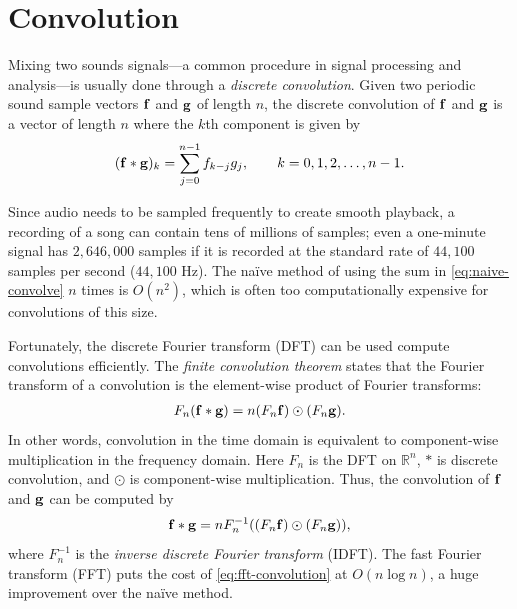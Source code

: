 
\section*{Convolution} %

Mixing two sounds signals---a common procedure in signal processing and analysis---is usually done through a \emph{discrete convolution}.
Given two periodic sound sample vectors $\mathbf{f}$ and $\mathbf{g}$ of length $n$, the discrete convolution of $\mathbf{f}$ and $\mathbf{g}$ is a vector of length $n$ where the $k$th component is given by
\begin{align}
(\mathbf{f} \ast \mathbf{g})_k = \sum_{j=0}^{n-1} f_{k-j}g_j,\qquad k = 0,1,2,\dots,n-1.
\label{eq:naive-convolve}
\end{align}

Since audio needs to be sampled frequently to create smooth playback, a recording of a song can contain tens of millions of samples; even a one-minute signal has $2,646,000$ samples if it is recorded at the standard rate of $44,100$ samples per second ($44,100$ Hz).
The na\"ive method of using the sum in \eqref{eq:naive-convolve} $n$ times is $O(n^2)$, which is often too computationally expensive for convolutions of this size.

Fortunately, the discrete Fourier transform (DFT) can be used compute convolutions efficiently.
The \emph{finite convolution theorem} states that the Fourier transform of a convolution is the element-wise product of Fourier transforms:
\begin{align}
F_n(\mathbf{f} \ast \mathbf{g}) = n(F_n\mathbf{f})\odot (F_n\mathbf{g}).
\label{eq:convolution-theorem}
\end{align}
In other words, convolution in the time domain is equivalent to component-wise multiplication in the frequency domain.
Here $F_n$ is the DFT on $\mathbb{R}^n$, $\ast$ is discrete convolution, and $\odot$ is component-wise multiplication. %
Thus, the convolution of $\mathbf{f}$ and $\mathbf{g}$ can be computed by
\begin{align}
\mathbf{f} \ast \mathbf{g} = nF_n^{-1}((F_n\mathbf{f})\odot (F_n\mathbf{g})),
\label{eq:fft-convolution}
\end{align}
where $F_n^{-1}$ is the \emph{inverse discrete Fourier transform} (IDFT).
The fast Fourier transform (FFT) puts the cost of \eqref{eq:fft-convolution} at $O(n\log{n})$, a huge improvement over the na\"ive method.


